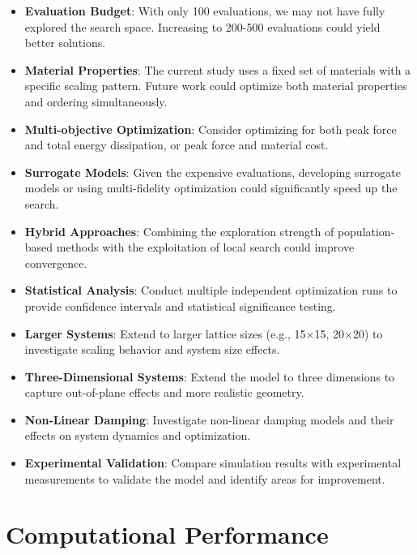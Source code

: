 \documentclass[11pt,a4paper]{article}
\begin{document}
\begin{itemize}
    \item \textbf{Evaluation Budget}: With only 100 evaluations, we may not have fully explored the search space. Increasing to 200-500 evaluations could yield better solutions.
    
    \item \textbf{Material Properties}: The current study uses a fixed set of materials with a specific scaling pattern. Future work could optimize both material properties and ordering simultaneously.
    
    \item \textbf{Multi-objective Optimization}: Consider optimizing for both peak force and total energy dissipation, or peak force and material cost.
    
    \item \textbf{Surrogate Models}: Given the expensive evaluations, developing surrogate models or using multi-fidelity optimization could significantly speed up the search.
    
    \item \textbf{Hybrid Approaches}: Combining the exploration strength of population-based methods with the exploitation of local search could improve convergence.
    
    \item \textbf{Statistical Analysis}: Conduct multiple independent optimization runs to provide confidence intervals and statistical significance testing.
    
    \item \textbf{Larger Systems}: Extend to larger lattice sizes (e.g., 15×15, 20×20) to investigate scaling behavior and system size effects.
    
    \item \textbf{Three-Dimensional Systems}: Extend the model to three dimensions to capture out-of-plane effects and more realistic geometry.
    
    \item \textbf{Non-Linear Damping}: Investigate non-linear damping models and their effects on system dynamics and optimization.
    
    \item \textbf{Experimental Validation}: Compare simulation results with experimental measurements to validate the model and identify areas for improvement.
\end{itemize}

\section{Computational Performance}
\end{document}
